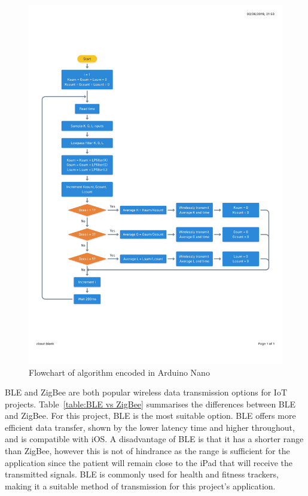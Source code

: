 \begin{figure}[t!]
\centering
\includegraphics[trim={1cm 5cm 1cm  4cm}, clip, width=1\textwidth]{./figures/psuedocode.pdf}
\captionsetup{justification=centering}
\caption{Flowchart of algorithm encoded in Arduino Nano}
\label{fig: psuedocode}
\end{figure}

BLE and ZigBee are both popular wireless data transmission options for IoT projects. Table~\ref{table:BLE vs ZigBee} summarises the differences between BLE and ZigBee. For this project, BLE is the most suitable option. BLE offers more efficient data transfer, shown by the lower latency time and higher throughout, and is compatible with iOS. A disadvantage of BLE is that it has a shorter range than ZigBee, however this is not of hindrance as the range is sufficient for the application since the patient will remain close to the iPad that will receive the transmitted signals. BLE is commonly used for health and fitness trackers, making it a suitable method of transmission for this project's application.


